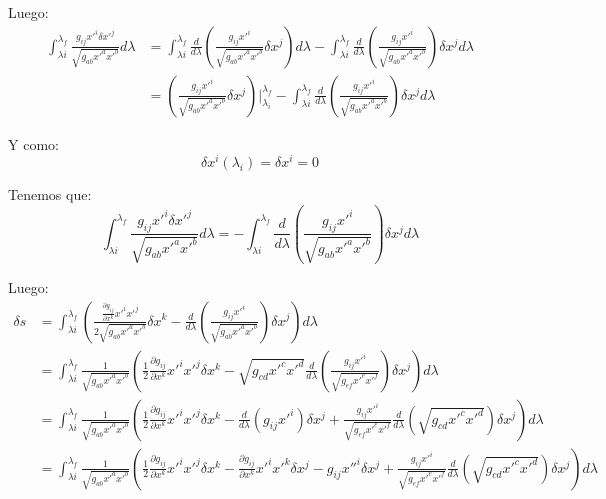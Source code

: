 \documentclass[paper=a4, fontsize=11pt,twoside]{scrartcl}
\begin{document}
Luego:
	\begin{align*}
		\int^{\lambda_{f}}_{\lambda{i}} \frac{g_{ij}x'^{i}\delta x'^{j}}{\sqrt{g_{ab}x'^{a}x'^{b}}} d\lambda
			&= \int^{\lambda_{f}}_{\lambda{i}} \frac{d}{d\lambda} \left(\frac{g_{ij}x'^{i}}{\sqrt{g_{ab}x'^{a}x'^{b}}} \delta x^{j}\right) d\lambda
			 - \int^{\lambda_{f}}_{\lambda{i}} \frac{d}{d\lambda} \left( \frac{g_{ij}x'^{i}}{\sqrt{g_{ab}x'^{a}x'^{b}}} \right)\delta x^{j} d\lambda \\
			&= \left( \frac{g_{ij}x'^{i}}{\sqrt{g_{ab}x'^{a}x'^{b}}} \delta x^{j} \right) \Big|^{\lambda_{f}}_{\lambda_{i}} 
			- \int^{\lambda_{f}}_{\lambda{i}} \frac{d}{d\lambda} \left( \frac{g_{ij}x'^{i}}{\sqrt{g_{ab}x'^{a}x'^{b}}} \right) \delta x^{j} d\lambda
	\end{align*}
	
Y como:
	\begin{equation*}
		\delta x^{i} (\lambda_{i}) = \delta x^{i} = 0
	\end{equation*}

Tenemos que:
	\begin{equation*}
		\int^{\lambda_{f}}_{\lambda{i}} \frac{g_{ij}x'^{i}\delta x'^{j}}{\sqrt{g_{ab}x'^{a}x'^{b}}} d\lambda
			= - \int^{\lambda_{f}}_{\lambda{i}} \frac{d}{d\lambda} \left( \frac{g_{ij}x'^{i}}{\sqrt{g_{ab}x'^{a}x'^{b}}} \right) \delta x^{j} d\lambda
	\end{equation*}
		
Luego:
	\begin{align*}
		\delta s &= \int^{\lambda_{f}}_{\lambda{i}} \left( \frac{\frac{\partial g_{ij}}{\partial x^{k}}x'^{i}x'^{j}}{2\sqrt{g_{ab}x'^{a}x'^{b}}} \delta x^{k}
				                                        -  \frac{d}{d\lambda} \left( \frac{g_{ij}x'^{i}}{\sqrt{g_{ab}x'^{a}x'^{b}}} \right) \delta x^{j} \right) d\lambda \\ 
				 &= \int^{\lambda_{f}}_{\lambda{i}} \frac{1}{\sqrt{g_{ab}x'^{a}x'^{b}}} \left( \frac{1}{2}\frac{\partial g_{ij}}{\partial x^{k}} x'^{i}x'^{j} \delta x^{k}
				                                        -  \sqrt{g_{cd}x'^{c}x'^{d}}\frac{d}{d\lambda} \left( \frac{g_{ij}x'^{i}}{\sqrt{g_{ef}x'^{e}x'^{f}}} \right) \delta x^{j} \right) d\lambda \\ 
				 &= \int^{\lambda_{f}}_{\lambda{i}} \frac{1}{\sqrt{g_{ab}x'^{a}x'^{b}}} \left( \frac{1}{2}\frac{\partial g_{ij}}{\partial x^{k}} x'^{i}x'^{j} \delta x^{k}
				                                        - \frac{d}{d\lambda} \left( g_{ij}x'^{i} \right) \delta x^{j}  
				                                        + \frac{g_{ij}x'^{i}}{\sqrt{g_{ef}x'^{e}x'^{f}}} \frac{d}{d\lambda} \left( \sqrt{g_{cd}x'^{c}x'^{d}} \right) \delta x^{j} 
														\right) d\lambda\\
				&= 	\int^{\lambda_{f}}_{\lambda{i}} \frac{1}{\sqrt{g_{ab}x'^{a}x'^{b}}} \left( \frac{1}{2}\frac{\partial g_{ij}}{\partial x^{k}} x'^{i}x'^{j} \delta x^{k}
				                                        - \frac{\partial g_{ij}}{\partial x^{k}} x'^{i} x'^{k}\delta x^{j} - g_{ij}x''^{i}\delta x^{j}  
				                                        + \frac{g_{ij}x'^{i}}{\sqrt{g_{ef}x'^{e}x'^{f}}} \frac{d}{d\lambda} \left( \sqrt{g_{cd}x'^{c}x'^{d}} \right) \delta x^{j} 
														\right) d\lambda										
	\end{align*}
	
\end{document}
